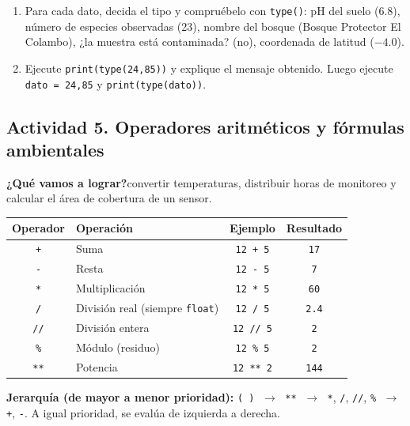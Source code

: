 \documentclass[11pt,a4paper]{article}
\newcommand{\code}[1]{\texttt{#1}}
\newcommand{\actividad}[1]{\begin{objetivo}\textbf{\color{tealProfundo}¿Qué vamos a lograr?}\enspace #1\end{objetivo}}
\begin{document}
\begin{experimente}
\begin{enumerate}[nosep]
  \item Para cada dato, decida el tipo y compruébelo con \code{type()}: pH del suelo (6.8), número de especies observadas (23), nombre del bosque (Bosque Protector El Colambo), ¿la muestra está contaminada? (no), coordenada de latitud ($-4.0$).
  \item Ejecute \code{print(type(24,85))} y explique el mensaje obtenido. Luego ejecute \code{dato = 24,85} y \code{print(type(dato))}.
\end{enumerate}
\end{experimente}

\subsection{Actividad 5. Operadores aritméticos y fórmulas ambientales}
\actividad{convertir temperaturas, distribuir horas de monitoreo y calcular el área de cobertura de un sensor.}

\begin{center}
\renewcommand{\arraystretch}{1.25}
\begin{tabular}{c l c c}
\toprule
\textbf{Operador} & \textbf{Operación} & \textbf{Ejemplo} & \textbf{Resultado} \\
\midrule
\code{+} & Suma & \code{12 + 5} & \code{17} \\
\code{-} & Resta & \code{12 - 5} & \code{7} \\
\code{*} & Multiplicación & \code{12 * 5} & \code{60} \\
\code{/} & División real (siempre \code{float}) & \code{12 / 5} & \code{2.4} \\
\code{//} & División entera & \code{12 // 5} & \code{2} \\
\code{\%} & Módulo (residuo) & \code{12 \% 5} & \code{2} \\
\code{**} & Potencia & \code{12 ** 2} & \code{144} \\
\bottomrule
\end{tabular}
\end{center}

\textbf{Jerarquía (de mayor a menor prioridad):} \code{( )} $\;\rightarrow\;$ \code{**} $\;\rightarrow\;$ \code{*}, \code{/}, \code{//}, \code{\%} $\;\rightarrow\;$ \code{+}, \code{-}. A igual prioridad, se evalúa de izquierda a derecha.
\end{document}
